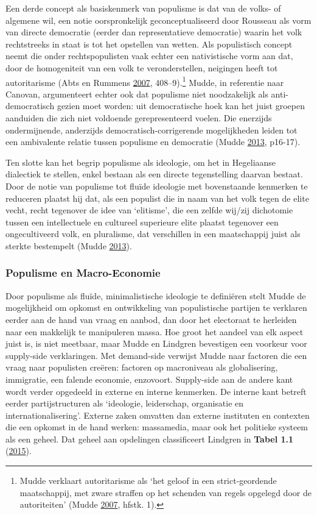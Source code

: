 \documentclass[10.5pt,dutch,]{article}
\begin{document}
Een derde concept als basiskenmerk van populisme is dat van de volks- of
algemene wil, een notie oorspronkelijk geconceptualiseerd door Rousseau
als vorm van directe democratie (eerder dan representatieve democratie)
waarin het volk rechtstreeks in staat is tot het opstellen van wetten.
Als populistisch concept neemt die onder rechtspopulisten vaak echter
een nativistische vorm aan dat, door de homogeniteit van een volk te
veronderstellen, neigingen heeft tot autoritarisme (Abts en Rummens
\protect\hyperlink{ref-abtsux5fpopulismux5f2007}{2007},
408--9).\footnote{Mudde verklaart autoritarisme als `het geloof in een
  strict-geordende maatschappij, met zware straffen op het schenden van
  regels opgelegd door de autoriteiten' (Mudde
  \protect\hyperlink{ref-muddeux5fpopulistux5f2007}{2007}, hfstk. 1).}
Mudde, in referentie naar Canovan, argumenteert echter ook dat populisme
niet noodzakelijk als anti-democratisch gezien moet worden: uit
democratische hoek kan het juist groepen aanduiden die zich niet
voldoende gerepresenteerd voelen. Die enerzijds ondermijnende,
anderzijds democratisch-corrigerende mogelijkheden leiden tot een
ambivalente relatie tussen populisme en democratie (Mudde
\protect\hyperlink{ref-muddeux5foxfordux5f2013}{2013}, p16-17).

Ten slotte kan het begrip populisme als ideologie, om het in Hegeliaanse
dialectiek te stellen, enkel bestaan als een directe tegenstelling
daarvan bestaat. Door de notie van populisme tot fluïde ideologie met
bovenstaande kenmerken te reduceren plaatst hij dat, als een populist
die in naam van het volk tegen de elite vecht, recht tegenover de idee
van `elitisme', die een zelfde wij/zij dichotomie tussen een
intellectuele en cultureel superieure elite plaatst tegenover een
ongecultiveerd volk, en pluralisme, dat verschillen in een maatschappij
juist als sterkte bestempelt (Mudde
\protect\hyperlink{ref-muddeux5foxfordux5f2013}{2013}).

\subsubsection{Populisme en
Macro-Economie}\label{populisme-en-macro-economie}

Door populisme als fluïde, minimalistische ideologie te definiëren stelt
Mudde de mogelijkheid om opkomst en ontwikkeling van populistische
partijen te verklaren eerder aan de hand van vraag en aanbod, dan door
het electoraat te herleiden naar een makkelijk te manipuleren massa. Hoe
groot het aandeel van elk aspect juist is, is niet meetbaar, maar Mudde
en Lindgren bevestigen een voorkeur voor supply-side verklaringen. Met
demand-side verwijst Mudde naar factoren die een vraag naar populisten
creëren: factoren op macroniveau als globalisering, immigratie, een
falende economie, enzovoort. Supply-side aan de andere kant wordt verder
opgedeeld in externe en interne kenmerken. De interne kant betreft
eerder partijstructuren als `ideologie, leiderschap, organisatie en
internationalisering'. Externe zaken omvatten dan externe instituten en
contexten die een opkomst in de hand werken: massamedia, maar ook het
politieke systeem als een geheel. Dat geheel aan opdelingen
classificeert Lindgren in \textbf{Tabel 1.1}
(\protect\hyperlink{ref-lindgrenux5fdevelopingux5f2015}{2015}).
\end{document}
